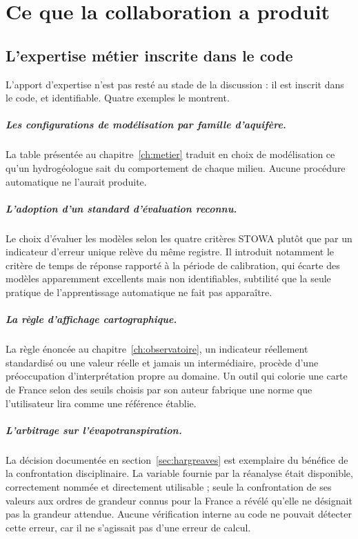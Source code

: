 \chapter{Ce que la collaboration a produit}
\label{ch:collaborations}



\section{L'expertise métier inscrite dans le code}
\label{sec:apport-metier}

L'apport d'expertise n'est pas resté au stade de la discussion : il est inscrit dans le code, et
identifiable. Quatre exemples le montrent.

\paragraph{Les configurations de modélisation par famille d'aquifère.} La table présentée au
chapitre~\ref{ch:metier} traduit en choix de modélisation ce qu'un hydrogéologue sait du
comportement de chaque milieu. Aucune procédure automatique ne l'aurait produite.

\paragraph{L'adoption d'un standard d'évaluation reconnu.} Le choix d'évaluer les modèles selon
les quatre critères STOWA plutôt que par un indicateur d'erreur unique relève du même registre.
Il introduit notamment le critère de temps de réponse rapporté à la période de calibration, qui
écarte des modèles apparemment excellents mais non identifiables, subtilité que la seule
pratique de l'apprentissage automatique ne fait pas apparaître.

\paragraph{La règle d'affichage cartographique.} La règle énoncée au
chapitre~\ref{ch:observatoire}, un indicateur réellement standardisé ou une valeur réelle et
jamais un intermédiaire, procède d'une préoccupation d'interprétation propre au domaine. Un
outil qui colorie une carte de France selon des seuils choisis par son auteur fabrique une norme
que l'utilisateur lira comme une référence établie.

\paragraph{L'arbitrage sur l'évapotranspiration.} La décision documentée en
section~\ref{sec:hargreaves} est exemplaire du bénéfice de la confrontation disciplinaire. La
variable fournie par la réanalyse était disponible, correctement nommée et directement
utilisable ; seule la confrontation de ses valeurs aux ordres de grandeur connus pour la France a
révélé qu'elle ne désignait pas la grandeur attendue. Aucune vérification interne au code ne
pouvait détecter cette erreur, car il ne s'agissait pas d'une erreur de calcul.

